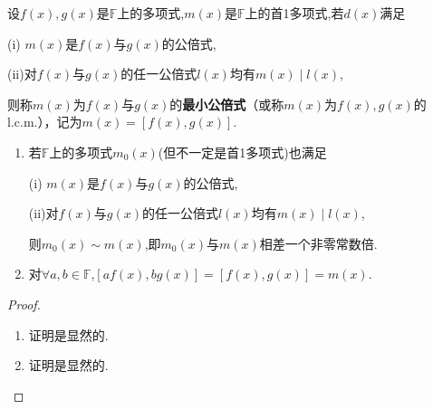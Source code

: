 \documentclass[lang=cn,newtx,10pt,scheme=chinese]{elegantbook}
\begin{document}
\begin{definition}[最小公倍式]\label{definition:最小公倍式}
设\(f(x),g(x)\)是\(\mathbb{F}\)上的多项式,$m(x)$是\(\mathbb{F}\)上的首1多项式,若\(d(x)\)满足

(i)\(\,\,m(x)\)是\(f(x)\)与\(g(x)\)的公倍式,

(ii)对\(f(x)\)与\(g(x)\)的任一公倍式\(l(x)\)均有\(m(x)\mid l(x)\),

则称\(m(x)\)为\(f(x)\)与\(g(x)\)的\textbf{最小公倍式}（或称\(m(x)\)为\(f(x),g(x)\)的 l.c.m.），记为\(m(x)=[f(x),g(x)]\).
\end{definition}

\begin{proposition}\label{proposition:最小公倍式的小结论}
\begin{enumerate}[(1)]
\item 若$\mathbb{F}$上的多项式$m_0(x)$(但不一定是首1多项式)也满足

(i)\(\,\,m(x)\)是\(f(x)\)与\(g(x)\)的公倍式,

(ii)对\(f(x)\)与\(g(x)\)的任一公倍式\(l(x)\)均有\(m(x)\mid l(x)\),

则$m_0(x)\sim m(x)$,即$m_0(x)$与$m(x)$相差一个非零常数倍.

\item 对$\forall a,b\in\mathbb{F}$,$[af(x),bg(x)]=[f(x),g(x)]=m(x)$.
\end{enumerate}
\end{proposition}
\begin{proof}
\begin{enumerate}[(1)]
\item 证明是显然的.

\item 证明是显然的.
\end{enumerate}
\end{proof}
\end{document}
